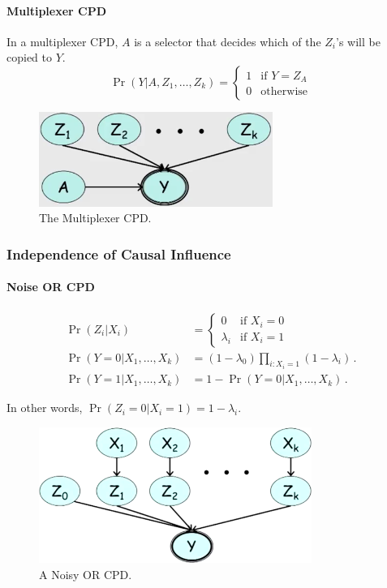 \documentclass[12pt]{article}
\begin{document}
\paragraph{Multiplexer CPD}

In a multiplexer CPD, $A$ is a selector that decides which of the $Z_i$'s will be copied to $Y$.
\begin{equation*}
  \Pr(Y | A, Z_1, \ldots, Z_k) = 
    \begin{cases}
    1 & \text{if } Y = Z_A \\
    0 & \text{otherwise}
    \end{cases}
\end{equation*}

\begin{figure}[H]
\centering
\includegraphics[width=3in]{graphics/multiplexer_cpd.png}
\caption{The Multiplexer CPD.}
\label{fig:multiplexer_cpd}
\end{figure}


\subsubsection{Independence of Causal Influence}

\paragraph{Noise OR CPD}
\begin{align*}
  \Pr(Z_i | X_i) & = 
    \begin{cases}
      0 & \text{if } X_i = 0 \\
      \lambda_i & \text{if } X_i = 1
    \end{cases} \\
  \Pr(Y=0 | X_1, \ldots, X_k) & = (1 - \lambda_0) \prod_{i: X_i = 1} (1 - \lambda_i) \, . \\
  \Pr(Y=1 | X_1, \ldots, X_k) & = 1 - \Pr(Y=0 | X_1, \ldots, X_k) \, .
\end{align*}

In other words, $\Pr(Z_i=0 | X_i=1) = 1 - \lambda_i$.

\begin{figure}[H]
\centering
\includegraphics[width=3.5in]{graphics/noisy_or_cpd.png}
\caption{A Noisy OR CPD.}
\label{fig:noisy_or_cpd}
\end{figure}
\end{document}
